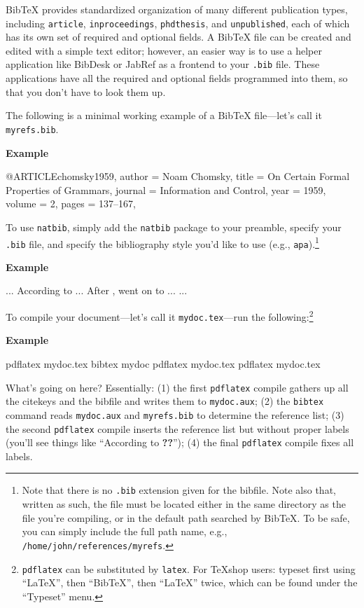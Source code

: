 \documentclass[letterpaper,12pt]{article}
\newcounter{ex-count}
\newenvironment{example}{%
  \quote
  \textbf{Example \arabic{ex-count}}
  \verbatim
}{%
  \endverbatim
  \endquote
  \stepcounter{ex-count}
}
\begin{document}
Bib\TeX{} provides standardized organization of many different publication
types, including \verb-article-, \verb-inproceedings-, \verb-phdthesis-, and
\verb-unpublished-, each of which has its own set of required and optional
fields. A Bib\TeX{} file can be created and edited with a simple text editor;
however, an easier way is to use a helper application like BibDesk or JabRef as
a frontend to your \verb-.bib- file. These applications have all the required
and optional fields programmed into them, so that you don't have to look them
up.

The following is a minimal working example of a Bib\TeX{} file---let's call it
\verb-myrefs.bib-.

\begin{example}
@ARTICLE{chomsky1959,
  author = {Noam Chomsky},
  title = {On Certain Formal Properties of Grammars},
  journal = {Information and Control},
  year = {1959},
  volume = {2},
  pages = {137--167},
}
\end{example}

To use \verb-natbib-, simply add the \verb-natbib- package to your preamble,
specify your \verb-.bib- file, and specify the bibliography style you'd like to
use (e.g., \verb-apa-).\footnote{%
    Note that there is no \texttt{.bib} extension given for the bibfile. Note
    also that, written as such, the file must be located either in the same
    directory as the file you're compiling, or in the default path searched by
    Bib\TeX{}. To be safe, you can simply include the full path name, e.g.,
    \texttt{/home/john/references/myrefs}.
}

\begin{example}
\usepackage{natbib}
...
According to \citet{chomsky1959} ... After \citeyear{chomsky1959},
\citeauthor{chomsky1959} went on to ...
...


\end{example}

To compile your document---let's call it \verb-mydoc.tex----run the
following:\footnote{%
    \texttt{pdflatex} can be substituted by \texttt{latex}. For \TeX{}shop
    users: typeset first using ``LaTeX'', then ``BibTeX'', then ``LaTeX'' twice,
    which can be found under the ``Typeset'' menu.
}

\begin{example}
pdflatex mydoc.tex
bibtex mydoc
pdflatex mydoc.tex
pdflatex mydoc.tex
\end{example}

What's going on here? Essentially: (1) the first \verb-pdflatex- compile gathers
up all the citekeys and the bibfile and writes them to \verb-mydoc.aux-; (2) the
\verb-bibtex- command reads \verb-mydoc.aux- and \verb-myrefs.bib- to determine
the reference list; (3) the second \verb-pdflatex- compile inserts the reference
list but without proper labels (you'll see things like ``According to
\textbf{??}''); (4) the final \verb-pdflatex- compile fixes all labels.
\end{document}
